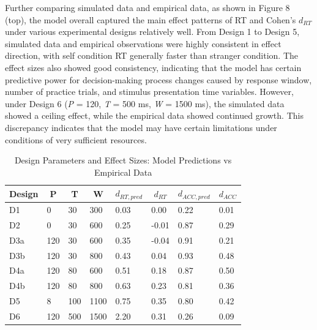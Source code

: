 \documentclass[
  english,
  man,floatsintext]{apa6}
\begin{document}
Further comparing simulated data and empirical data, as shown in Figure 8 (top), the model overall captured the main effect patterns of RT and Cohen's \(d_{RT}\) under various experimental designs relatively well. From Design 1 to Design 5, simulated data and empirical observations were highly consistent in effect direction, with self condition RT generally faster than stranger condition. The effect sizes also showed good consistency, indicating that the model has certain predictive power for decision-making process changes caused by response window, number of practice trials, and stimulus presentation time variables. However, under Design 6 (\emph{P} = 120, \emph{T} = 500 ms, \emph{W} = 1500 ms), the simulated data showed a ceiling effect, while the empirical data showed continued growth. This discrepancy indicates that the model may have certain limitations under conditions of very sufficient resources.

\begin{table}[tbp]

\begin{center}
\begin{threeparttable}

\caption{\label{tab:tbl-design-effect-sizes}Design Parameters and Effect Sizes: Model Predictions vs Empirical Data}

\begin{tabular}{llllllll}
\toprule
Design & \multicolumn{1}{c}{P} & \multicolumn{1}{c}{T} & \multicolumn{1}{c}{W} & \multicolumn{1}{c}{$d_{RT,pred}$} & \multicolumn{1}{c}{$d_{RT}$} & \multicolumn{1}{c}{$d_{ACC,pred}$} & \multicolumn{1}{c}{$d_{ACC}$}\\
\midrule
D1 & 0 & 30 & 300 & 0.03 & 0.00 & 0.22 & 0.01\\
D2 & 0 & 30 & 600 & 0.25 & -0.01 & 0.87 & 0.29\\
D3a & 120 & 30 & 600 & 0.35 & -0.04 & 0.91 & 0.21\\
D3b & 120 & 30 & 800 & 0.43 & 0.04 & 0.93 & 0.48\\
D4a & 120 & 80 & 600 & 0.51 & 0.18 & 0.87 & 0.50\\
D4b & 120 & 80 & 800 & 0.63 & 0.23 & 0.81 & 0.36\\
D5 & 8 & 100 & 1100 & 0.75 & 0.35 & 0.80 & 0.42\\
D6 & 120 & 500 & 1500 & 2.20 & 0.31 & 0.26 & 0.09\\
\bottomrule
\end{tabular}

\end{threeparttable}
\end{center}

\end{table}
\end{document}
